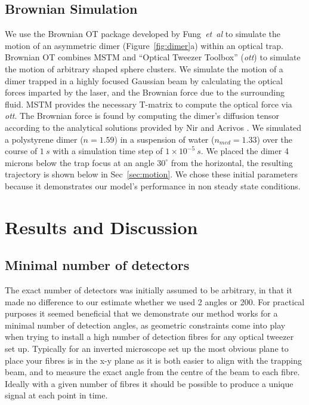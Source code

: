 \documentclass[preprint,  3p]{elsarticle}
\begin{document}
\subsection{Brownian Simulation}
\label{sec:brownian}

We use the Brownian OT package developed by Fung~\textit{et~al} \cite{Vigilante2020Brownian_OT} to simulate the motion of an asymmetric dimer (Figure~\ref{fig:dimer}a) within an optical trap. Brownian OT combines MSTM \cite{Mishchenko1996MSTM} and ``Optical Tweezer Toolbox'' (\textit{ott}) \cite{Lenton2020} to simulate the motion of arbitrary
shaped sphere clusters. We simulate the motion of a dimer trapped in a highly focused Gaussian beam by calculating the optical forces imparted by the laser, and the Brownian force due to the surrounding fluid. MSTM provides the necessary T-matrix to compute the optical force via \textit{ott}. The Brownian force is found by computing the dimer's diffusion tensor according to the analytical solutions provided by Nir and Acrivos \cite{nir_acrivos_1973}. We simulated a polystyrene dimer ($n = 1.59$) in a suspension of water ($n_{med} = 1.33$) over the course of $1 \ s$ with a simulation time step of $1 \times 10^{-5} \ s$. We placed the dimer 4 microns below the trap focus at an angle $30^{\circ}$ from the horizontal, the resulting trajectory is shown below in Sec~\ref{sec:motion}. We chose these initial parameters because it demonstrates our model's performance in non steady state conditions. 

\section{Results and  Discussion}
\label{sec:Discussion}
\subsection{Minimal number of detectors}
\label{sec:detectors}
The exact number of detectors was initially assumed to be arbitrary, in that it made no difference to our estimate whether we used 2 angles or 200. For practical purposes it seemed beneficial that we demonstrate our method works for a minimal number of detection angles, as geometric constraints come into play when trying to install a high number of detection fibres for any optical tweezer set up. Typically for an inverted microscope set up the most obvious plane to place your fibres is in the x-y plane as it is both easier to align with the trapping beam, and to measure the exact angle from the centre of the beam to each fibre. Ideally with a given number of fibres it should be possible to produce a unique signal at each point in time. 
\end{document}
